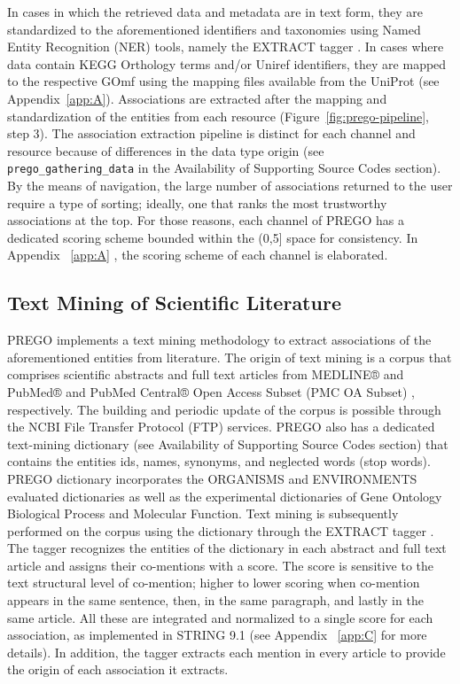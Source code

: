    In cases in which the retrieved data and metadata are in text form, they are standardized to the aforementioned identifiers and taxonomies using Named Entity Recognition (NER) tools, namely the EXTRACT tagger \cite{pafilis2016extract, jensen2016one}. 
   In cases where data contain KEGG Orthology terms and/or Uniref identifiers, they are mapped to the respective GOmf using the mapping files available from the UniProt (see Appendix~\ref{app:A}). 
   Associations are extracted after the mapping and standardization of the entities from each resource (Figure~\ref{fig:prego-pipeline}, step 3).
   The association extraction pipeline is distinct for each channel and resource because of differences in the data type origin (see \texttt{prego\_gathering\_data} in the Availability of Supporting Source Codes section). 
   By the means of navigation, the large number of associations returned to the user require a type of sorting; 
   ideally, one that ranks the most trustworthy associations at the top. 
   For those reasons, each channel of PREGO has a dedicated scoring scheme bounded within the (0,5] space for consistency. 
   In Appendix ~\ref{app:A} , the scoring scheme of each channel is elaborated.




   \subsection{Text Mining of Scientific Literature}
   \label{subsec:prego-tm}

   PREGO implements a text mining methodology to extract associations of the aforementioned entities from literature. 
   The origin of text mining is a corpus that comprises scientific abstracts and full text articles from MEDLINE® and PubMed® and PubMed Central® Open Access Subset (PMC OA Subset) \cite{sayers2021database}, respectively. 
   The building and periodic update of the corpus is possible through the NCBI File Transfer Protocol (FTP) services. 
   PREGO also has a dedicated text-mining dictionary (see Availability of Supporting Source Codes section) that contains the entities ids, names, synonyms, and neglected words (stop words). 
   PREGO dictionary incorporates the ORGANISMS \cite{pafilis2013species} and ENVIRONMENTS \cite{pafilis2015environments} evaluated dictionaries as well as the experimental dictionaries of Gene Ontology Biological Process and Molecular Function.
   Text mining is subsequently performed on the corpus using the dictionary through the EXTRACT tagger \cite{pafilis2016extract, jensen2016one}. 
   The tagger recognizes the entities of the dictionary in each abstract and full text article and assigns their co-mentions with a score. 
   The score is sensitive to the text structural level of co-mention; higher to lower scoring when co-mention appears in the same sentence, then, in the same paragraph, and lastly in the same article. 
   All these are integrated and normalized to a single score for each association, as implemented in STRING 9.1 \cite{franceschini2012string} (see Appendix ~\ref{app:C} for more details). 
   In addition, the tagger extracts each mention in every article to provide the origin of each association it extracts.


